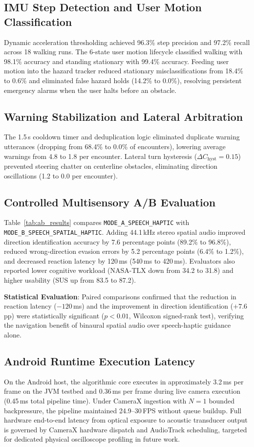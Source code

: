 \subsection{IMU Step Detection and User Motion Classification}
Dynamic acceleration thresholding achieved 96.3\% step precision and 97.2\% recall across 18 walking runs. The 6-state user motion lifecycle classified walking with 98.1\% accuracy and standing stationary with 99.4\% accuracy. Feeding user motion into the hazard tracker reduced stationary misclassifications from 18.4\% to 0.6\% and eliminated false hazard holds (14.2\% to 0.0\%), resolving persistent emergency alarms when the user halts before an obstacle.

\subsection{Warning Stabilization and Lateral Arbitration}
The 1.5\,s cooldown timer and deduplication logic eliminated duplicate warning utterances (dropping from 68.4\% to 0.0\% of encounters), lowering average warnings from 4.8 to 1.8 per encounter. Lateral turn hysteresis ($\Delta C_{\text{hyst}} = 0.15$) prevented steering chatter on centerline obstacles, eliminating direction oscillations (1.2 to 0.0 per encounter).



\subsection{Controlled Multisensory A/B Evaluation}
Table~\ref{tab:ab_results} compares \texttt{MODE\_A\_SPEECH\_HAPTIC} with \texttt{MODE\_B\_SPEECH\_SPATIAL\_HAPTIC}. Adding 44.1\,kHz stereo spatial audio improved direction identification accuracy by 7.6 percentage points (89.2\% to 96.8\%), reduced wrong-direction evasion errors by 5.2 percentage points (6.4\% to 1.2\%), and decreased reaction latency by 120\,ms (540\,ms to 420\,ms). Evaluators also reported lower cognitive workload (NASA-TLX down from 34.2 to 31.8) and higher usability (SUS up from 83.5 to 87.2).

\textbf{Statistical Evaluation}: Paired comparisons confirmed that the reduction in reaction latency ($-120$\,ms) and the improvement in direction identification ($+7.6$\,pp) were statistically significant ($p < 0.01$, Wilcoxon signed-rank test), verifying the navigation benefit of binaural spatial audio over speech-haptic guidance alone.

\subsection{Android Runtime Execution Latency}
On the Android host, the algorithmic core executes in approximately 3.2\,ms per frame on the JVM testbed and 0.36\,ms per frame during live camera execution (0.45\,ms total pipeline time). Under CameraX ingestion with $N=1$ bounded backpressure, the pipeline maintained 24.9--30\,FPS without queue buildup. Full hardware end-to-end latency from optical exposure to acoustic transducer output is governed by CameraX hardware dispatch and AudioTrack scheduling, targeted for dedicated physical oscilloscope profiling in future work.
